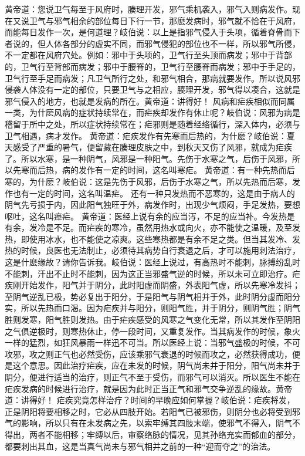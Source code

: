 \documentclass[a4paper,12pt,UTF8,twoside]{ctexbook}
\begin{document}
黄帝道：您说卫气每至于风府时，腠理开发，邪气乘机袭入，邪气入则病发作。现在又说卫气与邪气相余的部位每日下行一节，那麽发病时，邪气就不恰在于风府，而能每日发作一次，是何道理？岐伯说：以上是指邪气侵入于头项，循着脊骨而下者说的，但人体各部分的虚实不同，而邪气侵犯的部位也不一样，所以邪气所侵，不一定都在风府穴处。例如：邪中于头项的，卫气行至头顶而病发；邪中于背部的，卫气行至背部而病发；邪中于腰脊的，卫气行至腰脊而病发；邪中于手足的，卫气行至手足而病发；凡卫气所行之处，和邪气相合，那病就要发作。所以说风邪侵袭人体没有一定的部位，只要卫气与之相应，腠理开发，邪气得以凑合，这就是邪气侵入的地方，也就是发病的所在。黄帝道：讲得好！
风病和疟疾相似而同属一类，为什麽风病的症状持续常在，而疟疾却发作有休止呢？岐伯说：风邪为病是稽留于所中之处，所以症状持续常在；疟邪则是随着经络循行，深入体内，必须与卫气相遇，病才发作。
黄帝道：疟疾发作有先寒而后热的，为什麽？岐伯说：夏天感受了严重的暑气，便留藏在腠理皮肤之中，到秋天又伤了风邪，就成为疟疾了。所以水寒，是一种阴气，风邪是一种阳气。先伤于水寒之气，后伤于风邪，所以先寒而后热，病的发作有一定的时间，这名叫寒疟。
黄帝道：有一种先热而后寒的，为什麽？岐伯说：这是先伤于风邪，后伤于水寒之气，所以先热而后寒，发作也有一定的时间，这名叫温疟。
还有一种只发热而不恶寒的，这是由于病人的阴气先亏损于内，因此阳气独旺于外，病发作时，出现少气烦闷，手足发热，要想呕吐，这名叫瘅疟。
黄帝道：医经上说有余的应当泻，不足的应当补。今发热是有余，发冷是不足。而疟疾的寒冷，虽然用热水或向火，亦不能使之温暖，及至发热，即使用冰水，也不能使之凉爽。这些寒热都是有余不足之类。但当其发冷、发热的时候，良医也无法制止，必须待其病势自行衰退之后，才可以施用刺法治疗，这是什麽缘故？请你告诉我。岐伯说：医经上说过，有高热时不能刺，脉搏纷乱时不能刺，汗出不止时不能刺，因为这正当邪盛气逆的时候，所以未可立即治疗。疟疾刚开始发作，阳气并于阴分，此时阳虚而阴盛，外表阳气虚，所以先寒冷发抖；至阴气逆乱已极，势必复出于阳分，于是阳气与阴气相并于外，此时阴分虚而阳分实，所以先热而口渴。因为疟疾并与阳分，则阳气胜，并于阴分，则阴气胜；阴气胜则发寒，阳气胜则发热。由于疟疾感受的风寒之气变化无常，所以其发作至阴阳之气俱逆极时，则寒热休止，停一段时间，又重复发作。当其病发作的时候，象火一样的猛烈，如狂风暴雨一样迅不可当。所以医经上说：当邪气盛极的时候，不可攻邪，攻之则正气也必然受伤，应该乘邪气衰退的时候而攻之，必然获得成功，便是这个意思。因此治疗疟疾，应在未发的时候，阴气尚未并于阳分，阳气尚未并于阴分，便进行适当的治疗，则正气不至于受伤，而邪气可以消灭。所以医生不能在疟疾发病的时候进行治疗，就是因为此时正当正气和邪气交争逆乱的缘故。黄帝道：讲得好！
疟疾究竟怎样治疗？时间的早晚应如何掌握？岐伯说：疟疾将发，正是阴阳将要相移之时，它必从四肢开始。若阳气已被邪伤，则阴分也必将受到邪气的影响，所以只有在未发病之先，以索牢缚其四肢末端，使邪气不得入，阴气不得出，两者不能相移；牢缚以后，审察络脉的情况，见其孙络充实而郁血的部分，都要刺出其血，这是当真气尚未与邪气相并之前的一种“迎而夺之”的治法。
\end{document}
